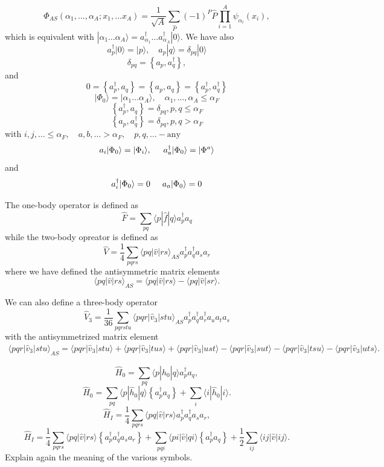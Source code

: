 \[
  \Phi_{AS}(\alpha_1, \dots, \alpha_A; x_1, \dots x_A)=
            \frac{1}{\sqrt{A}} \sum_{\hat{P}} (-1)^P \hat{P} \prod_{i=1}^A \psi_{\alpha_i}(x_i),
\]
which is equivalent with $|\alpha_1 \dots \alpha_A\rangle= a_{\alpha_1}^{\dagger} \dots a_{\alpha_A}^{\dagger} |0\rangle$. We have also
    \[
        a_p^\dagger|0\rangle = |p\rangle, \quad a_p |q\rangle = \delta_{pq}|0\rangle
    \]
\[
  \delta_{pq} = \left\{a_p, a_q^\dagger \right\},
\]
and 
\[
0 = \left\{a_p^\dagger, a_q \right\} = \left\{a_p, a_q \right\} = \left\{a_p^\dagger, a_q^\dagger \right\}
\]
\[
|\Phi_0\rangle = |\alpha_1 \dots \alpha_A\rangle, \quad \alpha_1, \dots, \alpha_A \leq \alpha_F
\]
\[
\left\{a_p^\dagger, a_q \right\}= \delta_{pq}, p, q \leq \alpha_F 
\]
\[
\left\{a_p, a_q^\dagger \right\} = \delta_{pq}, p, q > \alpha_F
\]
with         $i,j,\ldots \leq \alpha_F, \quad a,b,\ldots > \alpha_F, \quad p,q, \ldots - \textrm{any}$
\[
        a_i|\Phi_0\rangle = |\Phi_i\rangle, \hspace{0.5cm} a_a^\dagger|\Phi_0\rangle = |\Phi^a\rangle
\]
and         
\[
a_i^\dagger|\Phi_0\rangle = 0 \hspace{0.5cm}  a_a|\Phi_0\rangle = 0
\]




The one-body operator is defined as
\[
 \hat{F} = \sum_{pq} \langle p|\hat{f}|q\rangle a_p^\dagger a_q
\]
while the two-body opreator is defined as
\[
\hat{V} = \frac{1}{4} \sum_{pqrs} \langle pq|\hat{v}|rs\rangle_{AS} a_p^\dagger a_q^\dagger a_s a_r
\]
where we have defined the antisymmetric matrix elements
\[
\langle pq|\hat{v}|rs\rangle_{AS} = \langle pq|\hat{v}|rs\rangle - \langle pq|\hat{v}|sr\rangle.
\]

We can also define a three-body operator
\[
\hat{V}_3 = \frac{1}{36} \sum_{pqrstu} \langle pqr|\hat{v}_3|stu\rangle_{AS} 
                a_p^\dagger a_q^\dagger a_r^\dagger a_u a_t a_s
\]
with the antisymmetrized matrix element
\begin{align}
            \langle pqr|\hat{v}_3|stu\rangle_{AS} = \langle pqr|\hat{v}_3|stu\rangle + \langle pqr|\hat{v}_3|tus\rangle + \langle pqr|\hat{v}_3|ust\rangle- \langle pqr|\hat{v}_3|sut\rangle - \langle pqr|\hat{v}_3|tsu\rangle - \langle pqr|\hat{v}_3|uts\rangle.
\end{align}

\[	     
\hat{H}_0 = \sum_{pq} \langle p|\hat{h}_0|q\rangle a^{\dagger}_p a_q,
\]
\[
\hat{H}_0 = \sum_{pq} \langle p|\hat{h}_0|q\rangle \left\{a^\dagger_p a_q\right\} +
             \sum_i \langle i|\hat{h}_0|i\rangle.
\]
\[
  \hat{H}_I = \frac{1}{4} \sum_{pqrs} \langle pq|\hat{v}|rs\rangle a^\dagger_p a^\dagger_q a_s  a_r,
\]
\[
\hat{H}_I =\frac{1}{4} \sum_{pqrs} \langle pq|\hat{v}|rs\rangle \left\{a^\dagger_p a^\dagger_q a_s  a_r\right\}
            + \sum_{pqi} \langle pi|\hat{v}|qi\rangle \left\{a^\dagger_p a_q\right\} 
            + \frac{1}{2} \sum_{ij}\langle ij|\hat{v}|ij\rangle.
\]
Explain again the meaning of the various symbols.

